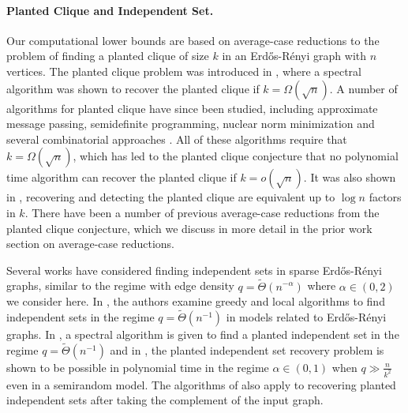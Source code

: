 \paragraph{Planted Clique and Independent Set.} Our computational lower bounds are based on average-case reductions to the problem of finding a planted clique of size $k$ in an Erd\H{o}s-R\'{e}nyi graph with $n$ vertices. The planted clique problem was introduced in \cite{alon1998finding}, where a spectral algorithm was shown to recover the planted clique if $k = \Omega(\sqrt{n})$. A number of algorithms for planted clique have since been studied, including approximate message passing, semidefinite programming, nuclear norm minimization and several combinatorial approaches \cite{feige2000finding, mcsherry2001spectral, feige2010finding, ames2011nuclear, dekel2014finding, deshpande2015finding, chen2016statistical}. All of these algorithms require that $k = \Omega(\sqrt{n})$, which has led to the planted clique conjecture that no polynomial time algorithm can recover the planted clique if $k = o(\sqrt{n})$. It was also shown in \cite{alon2007testing}, recovering and detecting the planted clique are equivalent up to $\log n$ factors in $k$. There have been a number of previous average-case reductions from the planted clique conjecture, which we discuss in more detail in the prior work section on average-case reductions.

Several works have considered finding independent sets in sparse Erd\H{o}s-R\'{e}nyi graphs, similar to the regime with edge density $q = \tilde{\Theta}(n^{-\alpha})$ where $\alpha \in (0, 2)$ we consider here. In \cite{coja2015independent, gamarnik2014limits, rahman2017local}, the authors examine greedy and local algorithms to find independent sets in the regime $q = \tilde{\Theta}(n^{-1})$ in models related to Erd\H{o}s-R\'{e}nyi graphs. In \cite{feige2005finding}, a spectral algorithm is given to find a planted independent set in the regime $q = \tilde{\Theta}(n^{-1})$ and in \cite{coja2003finding}, the planted independent set recovery problem is shown to be possible in polynomial time in the regime $\alpha \in (0, 1)$ when $q \gg \frac{n}{k^2}$ even in a semirandom model. The algorithms of \cite{chen2016statistical} also apply to recovering planted independent sets after taking the complement of the input graph.

